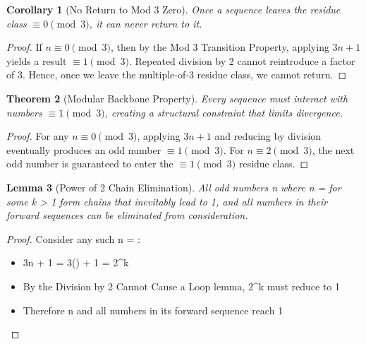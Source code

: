 \documentclass[11pt]{article}
\newtheorem{theorem}{Theorem}[section]
\newtheorem{lemma}[theorem]{Lemma}
\newtheorem{corollary}[theorem]{Corollary}
\begin{document}
\begin{corollary}[No Return to Mod 3 Zero]
Once a sequence leaves the residue class \(\equiv 0 \pmod{3}\), it can never return to it.
\end{corollary}

\begin{proof}
If \(n \equiv 0 \pmod{3}\), then by the Mod 3 Transition Property, applying \(3n+1\) yields a result \(\equiv 1 \pmod{3}\). Repeated division by 2 cannot reintroduce a factor of 3. Hence, once we leave the multiple-of-3 residue class, we cannot return.
\end{proof}

\begin{theorem}[Modular Backbone Property]
Every sequence must interact with numbers \( \equiv 1 \pmod{3} \), creating a structural constraint that limits divergence.
\end{theorem}

\begin{proof}
For any \( n \equiv 0 \pmod{3} \), applying \( 3n + 1 \) and reducing by division eventually produces an odd number \( \equiv 1 \pmod{3} \). For \( n \equiv 2 \pmod{3} \), the next odd number is guaranteed to enter the \( \equiv 1 \pmod{3} \) residue class.
\end{proof}

\begin{lemma}[Power of 2 Chain Elimination]
All odd numbers n where n =  for some k > 1 form chains that inevitably lead to 1, and all numbers in their forward sequences can be eliminated from consideration.
\end{lemma}

\begin{proof}
Consider any such n = :
\begin{itemize}
    \item 3n + 1 = 3() + 1 = 2^k
    \item By the Division by 2 Cannot Cause a Loop lemma, 2^k must reduce to 1
    \item Therefore n and all numbers in its forward sequence reach 1
\end{itemize}
\end{proof}
\end{document}
